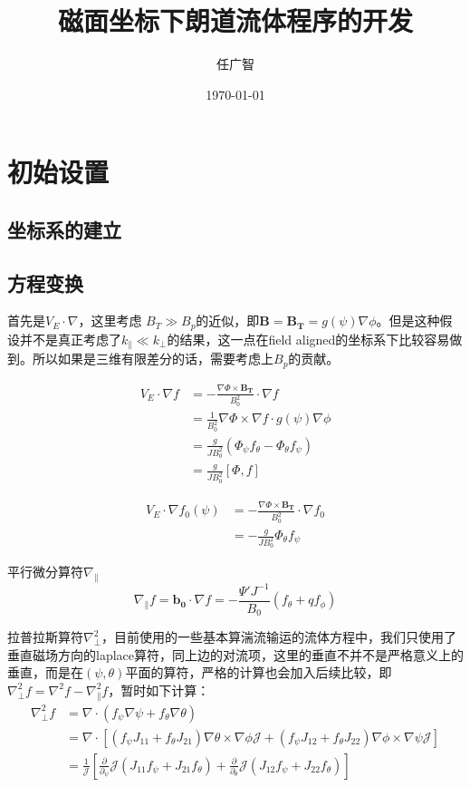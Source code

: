 \documentclass[11pt,a4paper]{article}
\title{磁面坐标下朗道流体程序的开发}
\author{任广智}
\date{\today}
\begin{document}
	
\maketitle
	
\section{初始设置}	
\subsection{坐标系的建立} 
\subsection{方程变换} 
首先是$V_E\cdot\nabla$，这里考虑 $B_T \gg B_p$的近似，即$\pmb{B}=\pmb{B_T}=g(\psi)\nabla\phi$。但是这种假设并不是真正考虑了$k_\parallel\ll k_\perp$的结果，这一点在field aligned的坐标系下比较容易做到。所以如果是三维有限差分的话，需要考虑上$B_p$的贡献。

$$
\begin{aligned}
V_E\cdot\nabla f
&= -\frac{\nabla\Phi\times\pmb{B_T}}{B^2_0}\cdot\nabla f \\  
&= \frac{1}{B_0^2}\nabla\Phi\times\nabla f\cdot g(\psi)\nabla\phi \\ 
&= \frac{g}{JB^2_0}(\Phi_\psi f_\theta - \Phi_\theta f_\psi) \\
&= \frac{g}{JB^2_0}[\Phi,f] 
\end{aligned}    
$$	
	
$$
\begin{aligned}
V_E\cdot\nabla f_0(\psi)
&= -\frac{\nabla\Phi\times\pmb{B_T}}{B^2_0}\cdot\nabla f_0 \\
&= -\frac{g}{JB^2_0} \Phi_\theta f_\psi
\end{aligned}
$$
	
平行微分算符$\nabla_\parallel$
$$ 
\nabla_\parallel f = \pmb{b_0}\cdot\nabla f = -\frac{\Psi'J^{-1}}{B_0}(f_\theta + qf_\phi)  
$$
	
拉普拉斯算符$\nabla^2_\perp$，目前使用的一些基本算湍流输运的流体方程中，我们只使用了垂直磁场方向的laplace算符，同上边的对流项，这里的垂直不并不是严格意义上的垂直，而是在$(\psi,\theta)$平面的算符，严格的计算也会加入后续比较，即$\nabla^2_\perp f= \nabla^2 f - \nabla^2_\parallel f$，暂时如下计算：
$$
\begin{aligned}
\nabla_\perp^2 f  
&= \nabla\cdot(f_\psi \nabla\psi + f_\theta\nabla\theta) \\
&= \nabla\cdot[ (f_\psi J_{11} + f_\theta J_{21}) \nabla\theta\times\nabla\phi\mathcal{J} + (f_\psi J_{12}+f_\theta J_{22}) \nabla\phi\times\nabla\psi\mathcal{J} ] \\
&= \frac{1}{\mathcal{J}} 
[ \frac{\partial}{\partial_\psi}\mathcal{J}(J_{11}f_\psi + J_{21}f_\theta) 
+\frac{\partial}{\partial_\theta}\mathcal{J}(J_{12}f_\psi + J_{22}f_\theta) ]  
\end{aligned}
$$
\end{document}
